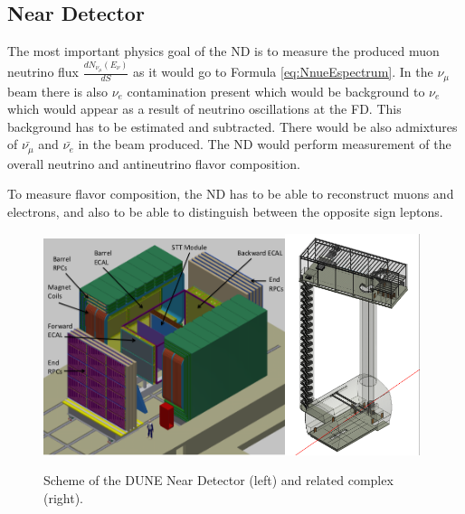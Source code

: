\subsection{Near Detector}

The most important physics goal of the ND is to measure the produced muon neutrino flux $\frac{dN_{\nu_\mu}(E_{\nu})}{dS}$ as it would go to Formula \ref{eq:NnueEspectrum}. In the $\nu_\mu$ beam there is also $\nu_e$ contamination present which would be background to $\nu_e$ which would appear as a result of neutrino oscillations at the FD. This background has to be estimated and subtracted. There would be also admixtures of $\bar{\nu_\mu}$ and $\bar{\nu_e}$ in the beam produced. The ND would perform measurement of the overall neutrino and antineutrino flavor composition. 

To measure flavor composition, the ND has to be able to reconstruct muons and electrons, and also to be able to distinguish between the opposite sign leptons. 

\begin{figure}
\caption{Scheme of the DUNE Near Detector (left) and related complex (right).}
\label{fig:nearDetector}
\centering
\includegraphics[width=0.63\textwidth, keepaspectratio=true]{figs/nearDetector.png}\includegraphics[width=0.35\textwidth, keepaspectratio=true]{figs/nearDetector_project.png}
\end{figure}

